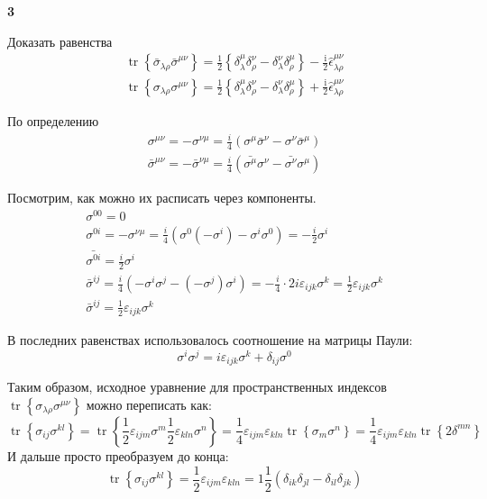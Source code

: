 \documentclass[a4paper,12pt]{article} %
\begin{document}
\begin{task}\textbf{3}

Доказать равенства
$$
\begin{array}{l}
\operatorname{tr}\left\{\bar{\sigma}_{\lambda \rho} \bar{\sigma}^{\mu \nu}\right\}=
\frac{1}{2}\left\{\delta_{\lambda}^{\mu} \delta_{\rho}^{\nu}-\delta_{\lambda}^{\nu} \delta_{\rho}^{\mu}\right\}
-\frac{\mathrm{i}}{2} \hat{\epsilon}_{\lambda \rho}^{\mu \nu} 
\\
\operatorname{tr}\left\{\sigma_{\lambda \rho} \sigma^{\mu \nu}\right\}=
\frac{1}{2}\left\{\delta_{\lambda}^{\mu} \delta_{\rho}^{\nu}-\delta_{\lambda}^{\nu} \delta_{\rho}^{\mu}\right\}+
\frac{\mathrm{i}}{2} \hat{\epsilon}_{\lambda \rho}^{\mu \nu}
\end{array}
$$

По определению 
$$
\begin{array}{l}
	\sigma^{\mu\nu}=-\sigma^{\nu \mu}=
	\frac{i}{4}(\sigma^\mu \bar{\sigma}^\nu - \sigma^\nu \bar{\sigma}^\mu)
	\\
	\bar{\sigma}^{\mu \nu}=-	\bar{\sigma}^{\nu \mu}=\frac{i}{4}(\bar{\sigma^\mu}\sigma^\nu-\bar{\sigma^\nu}\sigma^\mu)
\end{array}
$$

Посмотрим, как можно их расписать через компоненты.
$$
\begin{array}{l}
	\sigma^{00}=0 
	\\
	\sigma^{0i}=	
	-\sigma^{\nu \mu}=
	\frac{i}{4}(\sigma^0 (-\sigma^i) - \sigma^i \sigma^0)=
	-\frac{i}{2}\sigma^i
	\\
	\bar{\sigma^{0i}}=\frac{i}{2}\sigma^i
	\\
	\bar{\sigma}^{ij}=
	\frac{i}{4}(-\sigma^i\sigma^j-(-\sigma^j)\sigma^i)=
	-\frac{i}{4}\cdot 2 i \varepsilon_{ijk}\sigma^k=\frac{1}{2}\varepsilon_{ijk}\sigma^k
	\\
	\bar{\sigma}^{ij}=
	\frac{1}{2}\varepsilon_{ijk}\sigma^k
\end{array}
$$

В последних равенствах использовалось соотношение на матрицы Паули:
\[ \sigma^i \sigma^j=i\varepsilon_{ijk}\sigma^k+\delta_{ij}\sigma^0 \]

Таким образом, исходное уравнение для пространственных индексов $\operatorname{tr}\left\{\sigma_{\lambda \rho} \sigma^{\mu \nu}\right\}$ можно переписать как:
\[ \operatorname{tr}\left\{\sigma_{i j} \sigma^{kl}\right\}=
\operatorname{tr}\left\{ 	\frac{1}{2}\varepsilon_{ijm}\sigma^m 	\frac{1}{2}\varepsilon_{kln}\sigma^n \right\}=
\frac{1}{4}\varepsilon_{ijm}\varepsilon_{kln}\operatorname{tr}\left\{\sigma_{m} \sigma^{n}\right\} =
\frac{1}{4}\varepsilon_{ijm}\varepsilon_{kln}\operatorname{tr}\left\{2\delta^{mn}\right\} \]
И дальше просто преобразуем до конца:
\[ \operatorname{tr}\left\{\sigma_{ij} \sigma^{kl}\right\}=
\frac{1}{2}\varepsilon_{ijm}\varepsilon_{kln}=1\frac{1}{2}(\delta_{ik}\delta_{jl}-\delta_{il}\delta_{jk})\]


\end{task}
\end{document}
